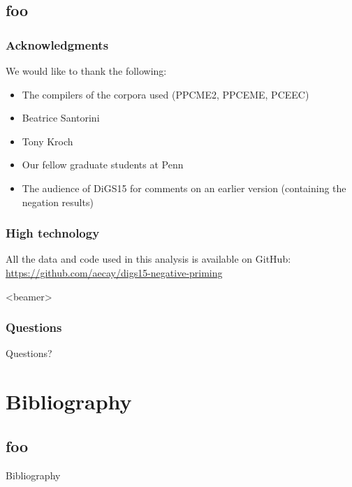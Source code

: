 \documentclass{digs-slides}
\begin{document}
\subsection{foo}

\begin{frame}
    \frametitle{Acknowledgments}
    We would like to thank the following:
    \begin{itemize}
      \item The compilers of the corpora used (PPCME2, PPCEME, PCEEC)
      \item Beatrice Santorini
      \item Tony Kroch
      \item Our fellow graduate students at Penn
      \item The audience of DiGS15 for comments on an earlier version
        (containing the negation results)
    \end{itemize}
\end{frame}

\begin{frame}
    \frametitle{High technology}
    All the data and code used in this analysis is available on GitHub:
    \url{https://github.com/aecay/digs15-negative-priming}
\end{frame}

\begin{frame}<beamer>
    \frametitle{Questions}
    \begin{center}
        \Huge
        Questions?
    \end{center}
\end{frame}

\section{Bibliography}
\label{sec:bibliography}

\subsection*{foo}

\begin{frame}[allowframebreaks=0.9]{Bibliography}
    \printbibliography[heading=none]
\end{frame}

\end{document}

